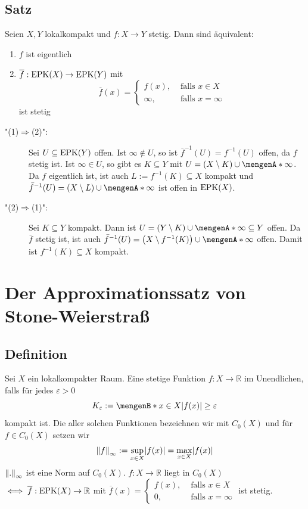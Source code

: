 \subsection[Satz: Charakterisierung von eigentlichen stetigen Abbildungen]{Satz} %
\label{sub:510}
Seien $X,Y$ lokalkompakt und $f : X \to Y$ stetig. Dann sind äquivalent:
\begin{enumerate}[(1)]
	\item $f$ ist eigentlich
	\item $\overline{f} : \operatorname{EPK}(X) \to \operatorname{EPK}(Y) $ mit 
	\[
		\overline{f} (x) = \begin{cases}
			f(x), &\text{ falls }x \in X\\
			\infty, &\text{ falls } x = \infty
		\end{cases} 
	\]
	ist stetig
\end{enumerate}
\begin{description}
	\item["(1)$\Rightarrow$(2)":] Sei $U \subseteq \operatorname{EPK}(Y)$ offen. Ist $\infty \not\in U$, so ist $\bar f^{-1}(U)= f ^{-1}(U)$ offen, da $f$ stetig ist. Ist 
	$\infty \in U$, so gibt es $K \subseteq Y$ mit $U = (X \setminus K) \cup \set{\infty}$. Da $f$ eigentlich ist, ist auch $L := f ^{-1}(K) \subseteq X$ kompakt und
	$\bar f ^{-1} (U) = (X \setminus L) \cup \set{\infty}$ ist offen in $\operatorname{EPK}(X)$.
	\item["(2)$\Rightarrow $(1)":] Sei $K \subseteq Y$ kompakt. Dann ist $U = (Y \setminus K) \cup \set{\infty} \subseteq Y$ offen. Da $\bar f$ stetig ist, ist auch 
	$\bar f ^{-1} (U) = \enbrace*{X \setminus f ^{-1}(K)} \cup \set{\infty}$ offen. Damit ist $f ^{-1}(K) \subseteq X$ kompakt. \bewende  
\end{description}
\newpage
\section{Der Approximationssatz von Stone-Weierstraß} %
\label{sec:6}

\subsection[Definition: Verschwinden stetiger Funktionen im Unendlichen]{Definition} %
\label{sub:61}
Sei $X$ ein lokalkompakter Raum. Eine stetige Funktion $f : X \to \mathds{R}$  im Unendlichen, falls für jedes 
$\varepsilon >0$ 
\[
	K_\varepsilon := \set[x \in X]{\abs{f(x)} \ge \varepsilon} 
\] 
kompakt ist. Die  aller solchen Funktionen bezeichnen wir mit $C_0(X)$ und für $f \in C_0 (X) $ setzen wir 
\[
	\norm[\infty]{f} :=  \sup_{x \in X} \abs*{f(x)} = \max_{x \in X} \abs*{f(x)}  
\]
$\norm[\infty]{.} $ ist eine Norm auf $C_0(X)$.
$f : X \to \mathds{R}$ liegt in $C_0(X)$ $\iff \overline{f} : \operatorname{EPK}(X) \to \mathbb{R} $ mit $\overline{f}(x) = \begin{cases}
	f(x), &\text{ falls }x \in X\\
	0 , &\text{ falls } x= \infty
\end{cases} $ ist stetig.

